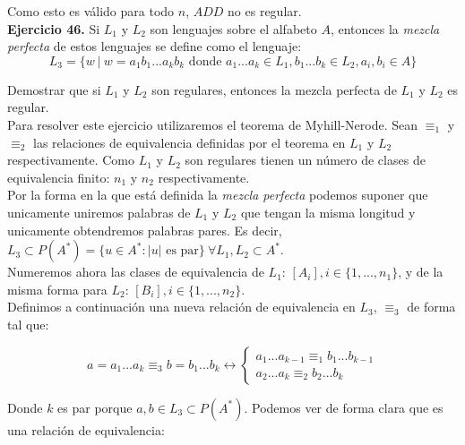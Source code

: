 \documentclass[11pt,a4paper]{article}
\begin{document}
Como esto es válido para todo $n$, $ADD$ no es regular. \\

\textbf{Ejercicio 46.} Si $L_1$ y $L_2$ son lenguajes sobre el alfabeto $A$, entonces la \emph{mezcla perfecta} de estos lenguajes se define como el lenguaje:
$$L_3 = \{w \ |\ w = a_1b_1...a_kb_k \text{ donde } a_1...a_k \in L_1, b_1...b_k \in L_2, a_i,b_i \in A\}$$

Demostrar que si $L_1$ y $L_2$ son regulares, entonces la mezcla perfecta de $L_1$ y $L_2$ es regular. \\

Para resolver este ejercicio utilizaremos el teorema de Myhill-Nerode. Sean $\equiv_1$ y $\equiv_2$ las relaciones de equivalencia definidas por el teorema en $L_1$ y $L_2$ respectivamente. Como $L_1$ y $L_2$ son regulares tienen un número de clases de equivalencia finito: $n_1$ y $n_2$ respectivamente. \\

Por la forma en la que está definida la \emph{mezcla perfecta} podemos suponer que unicamente uniremos palabras de $L_1$ y $L_2$ que tengan la misma longitud y unicamente obtendremos palabras pares. Es decir, $L_3 \subset P(A^*) = \{u \in A^* : |u| \text{ es par}\} \ \forall L_1,L_2 \subset A^*$. \\

Numeremos ahora las clases de equivalencia de $L_1$: $[A_i], i \in \{1,...,n_1\}$, y de la misma forma para $L_2$: $[B_i], i \in \{1,...,n_2\}$. \\

Definimos a continuación una nueva relación de equivalencia en $L_3$, $\equiv_3$ de forma tal que:

$$ a = a_1...a_k \equiv_3 b = b_1...b_k \leftrightarrow \begin{cases} a_1...a_{k-1} \equiv_1 b_1...b_{k-1} \\ a_2...a_k \equiv_2 b_2...b_k \end{cases} $$

Donde $k$ es par porque $a,b \in L_3 \subset P(A^*)$. Podemos ver de forma clara que es una relación de equivalencia:
\end{document}
